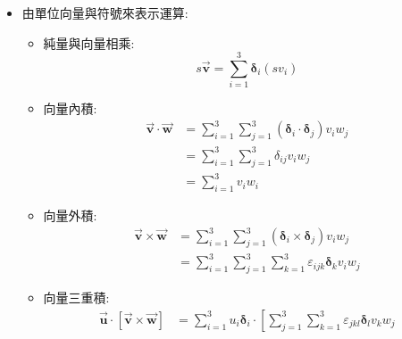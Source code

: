 \documentclass[../main.tex]{subfiles}
\begin{document}
\begin{itemize}
\begin{itemize}
        當$\sum$遇到平方時，可以再生出一個$\sum$來表示
        \begin{equation}
          \boxed{\left(\sum_{i=1}^3 a_i\right)^2 = \sum_{i=1}^3 \sum_{j=1}^3 a_i a_j}
        \end{equation}
      \item 二階張量:\\ 
        來自一個張量:$\overline{\overline  {\bm \tau}}$
        \begin{equation}
          \overline{\overline  {\bm \tau}} = \sum_{i=1}^3 \sum_{j=1}^3  \bm \delta_i \bm \delta_j \tau_{ij}
        \end{equation}
        來自兩個向量的直積:$\vec {\bm v} \vec {\bm w}$
        \begin{equation}
          \vec {\bm v} \vec {\bm w} = \sum_{i=1}^3 \sum_{j=1}^3 \bm \delta_i \bm \delta_j v_i w_j
        \end{equation} 
    \end{itemize}
  \item 由單位向量與符號來表示運算:
    \begin{itemize}
      \item 純量與向量相乘:
        \begin{equation}
          s\vec {\bm v} = \sum_{i=1}^3 \bm \delta_i (s v_i)
        \end{equation}
      \item 向量內積:
        \begin{align}
          \vec {\bm v} \cdot \vec {\bm w} &= \sum_{i=1}^3 \sum_{j=1}^3 (\bm \delta_i \cdot \bm \delta_j) v_i w_j \nonumber\\
          &= \sum_{i=1}^3 \sum_{j=1}^3 \delta_{ij} v_i w_j \nonumber\\
          &= \sum_{i=1}^3 v_i w_i
        \end{align}
      \item 向量外積:
        \begin{align}
          \vec {\bm v} \times \vec {\bm w} &= \sum_{i=1}^3 \sum_{j=1}^3 (\bm \delta_i \times \bm \delta_j) v_i w_j \nonumber\\
          &= \sum_{i=1}^3 \sum_{j=1}^3 \sum_{k=1}^3 \varepsilon_{ijk} \bm \delta_k v_i w_j
        \end{align}
      \item 向量三重積:
        \begin{align}
          \vec {\bm u} \cdot \left[\vec {\bm v} \times \vec {\bm w}\right] &= \sum_{i=1}^3 u_i \bm \delta_i \cdot
          \left[
            \sum_{j=1}^3 \sum_{k=1}^3 \varepsilon_{jkl} \bm \delta_l v_k w_j

\end{align}
\end{itemize}
\end{itemize}
\end{document}

